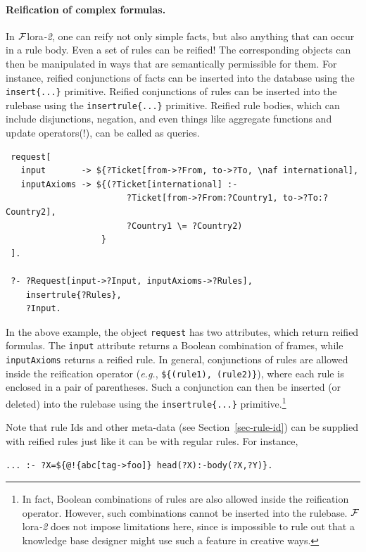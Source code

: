 \documentclass[11pt]{article}
\newcommand{\FLORA}{{\mbox{\sc ${\cal F}${lora}\rm\emph{-2}}}\xspace}
\newcommand{\FLSYSTEM}{\FLORA}
\begin{document}
\paragraph{Reification of complex formulas.}
In \FLSYSTEM, one can reify not only simple facts, but also anything that
can occur in a rule body. Even a set of rules can be reified!
The corresponding objects can then be manipulated in ways that are semantically
permissible for them. For instance, reified conjunctions of facts can be
inserted into the database using the \verb|insert{...}| primitive. 
Reified conjunctions of rules can be inserted into the rulebase using the
\verb|insertrule{...}| primitive. Reified rule bodies, which can include
disjunctions, negation, and even things like aggregate functions and update
operators(!), can be called as queries.
\begin{verbatim}
 request[
   input       -> ${?Ticket[from->?From, to->?To, \naf international],
   inputAxioms -> ${(?Ticket[international] :-
                        ?Ticket[from->?From:?Country1, to->?To:?Country2],
                        ?Country1 \= ?Country2)
                   }
 ].

 ?- ?Request[input->?Input, inputAxioms->?Rules],
    insertrule{?Rules},
    ?Input.
\end{verbatim}

In the above example, the object {\tt request} has two attributes, which
return reified formulas. The {\tt input} attribute returns a Boolean
combination of frames, while {\tt inputAxioms} returns a reified rule.
In general, conjunctions of rules are allowed inside the reification
operator ({\it e.g.}, \verb|${(rule1), (rule2)}|), where each rule is
enclosed in a pair of parentheses. Such a conjunction can then be inserted
(or deleted) into the rulebase using the {\tt insertrule\{...\}}
primitive.\footnote{
  In fact, Boolean combinations of rules are also allowed inside the
  reification operator. However, such combinations cannot be inserted into
  the rulebase. \FLSYSTEM does not impose limitations here, since is
  impossible to rule out that a knowledge base designer might use such a
  feature in creative ways.
}

Note that rule Ids and other meta-data (see
Section~\ref{sec-rule-id}) can be supplied with reified rules just like it
can be with regular rules. For instance,
\begin{verbatim}
... :- ?X=${@!{abc[tag->foo]} head(?X):-body(?X,?Y)}.
\end{verbatim}
\end{document}
